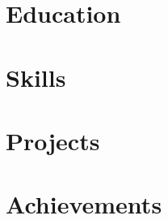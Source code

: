 \documentclass[letter,11pt]{article}
\begin{document}


\section{Education}


\section{Skills}


\section{Projects}


\section{Achievements}



\end{document}
